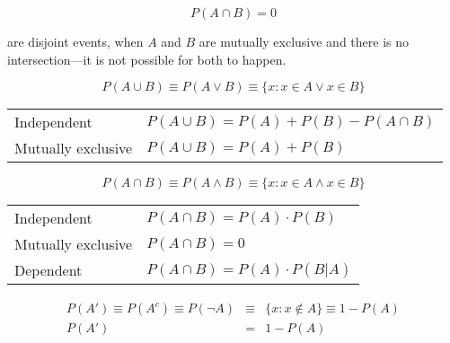 
\begin{equation}
   P(A \cap B) = 0
\end{equation}

\vspace{.63em}
are disjoint events, when $A$ and $B$ are mutually exclusive and there is no intersection---it is not possible for both to happen.
\hformbar




\begin{equation}
    P(A \cup B) \equiv P(A \vee B) \equiv \{x: x \in A \vee x \in B\}
\end{equation}

\begin{center}
  \begin{tabular}{ll}
    Independent         & $P(A \cup B) = P(A) + P(B) - P(A \cap B)$   \\
    Mutually exclusive  & $P(A \cup B) = P(A) + P(B)$                 \\
  \end{tabular}
\end{center}

\hformbar




\begin{equation}
    P(A \cap B) \equiv P(A \wedge B) \equiv \{x: x \in A \wedge x \in B\}
\end{equation}

\begin{center}
  \begin{tabular}{ll}
    Independent         & $P(A \cap B) = P(A) \cdot P(B)$   \\
    Mutually exclusive  & $P(A \cap B) = 0$                 \\
    Dependent           & $P(A \cap B) = P(A) \cdot P(B|A)$ \\
  \end{tabular}
\end{center}

\hformbar




\begin{eqnarray}
P(A') \equiv P(A^c) \equiv P(\neg A) &\equiv& \{x: x \notin A\} \equiv 1 - P(A) \\
P(A') &=& 1 - P(A)
\end{eqnarray}

